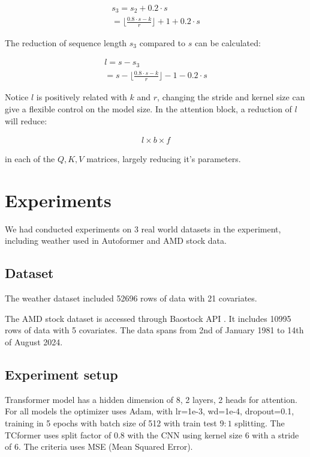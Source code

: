\documentclass[stu,12pt,floatsintext]{apa7}
\begin{document}
\begin{gather}
    s_3=s_2+0.2\cdot s\\
    =\lfloor\frac{0.8\cdot s-k}{r} \rfloor+1+0.2\cdot s
\end{gather}

The reduction of sequence length $s_3$ compared to $s$ can be calculated:

\begin{gather}
    l=s-s_3\\
    =s-\lfloor\frac{0.8\cdot s-k}{r} \rfloor-1-0.2\cdot s
\end{gather}

Notice $l$ is positively related with $k$ and $r$, changing the stride and kernel size can give a flexible control on the model size. In the attention block, a reduction of $l$ will reduce:

\begin{gather}
    l\times b\times f
\end{gather}

in each of the $Q,K,V$ matrices, largely reducing it's parameters.

\section{Experiments}

We had conducted experiments on 3 real world datasets in the experiment, including weather used in Autoformer \parencite{autoformer} and AMD stock data. 

\subsection{Dataset}

The weather dataset included 52696 rows of data with 21 covariates. 

The AMD stock dataset is accessed through Baostock API \parencite{baostock}. It includes 10995 rows of data with 5 covariates. The data spans from 2nd of January 1981 to 14th of August 2024. 

\subsection{Experiment setup}

Transformer model has a hidden dimension of 8, 2 layers, 2 heads for attention. For all models the optimizer uses Adam, with lr=1e-3, wd=1e-4, dropout=0.1, training in 5 epochs with batch size of 512 with train test $9:1$ splitting. The TCformer uses split factor of 0.8 with the CNN using kernel size 6 with a stride of 6. The criteria uses MSE (Mean Squared Error). 
\end{document}
